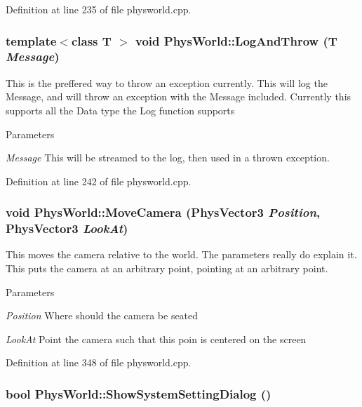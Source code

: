 Definition at line 235 of file physworld.cpp.\hypertarget{classPhysWorld_a1c2aeaed2a89821a4545db854da33ab8}{
\subsubsection[{LogAndThrow}]{\setlength{\rightskip}{0pt plus 5cm}template$<$class T $>$ void PhysWorld::LogAndThrow (T {\em Message})}}
\label{db/df5/classPhysWorld_a1c2aeaed2a89821a4545db854da33ab8}


This is the preffered way to throw an exception currently. This will log the Message, and will throw an exception with the Message included. Currently this supports all the Data type the Log function supports 
\begin{DoxyParams}{Parameters}
\item[{\em Message}]This will be streamed to the log, then used in a thrown exception. \end{DoxyParams}


Definition at line 242 of file physworld.cpp.\hypertarget{classPhysWorld_a1df24ee06d5881825902b60e0d81174a}{
\subsubsection[{MoveCamera}]{\setlength{\rightskip}{0pt plus 5cm}void PhysWorld::MoveCamera ({\bf PhysVector3} {\em Position}, \/  {\bf PhysVector3} {\em LookAt})}}
\label{db/df5/classPhysWorld_a1df24ee06d5881825902b60e0d81174a}


This moves the camera relative to the world. The parameters really do explain it. This puts the camera at an arbitrary point, pointing at an arbitrary point. 
\begin{DoxyParams}{Parameters}
\item[{\em Position}]Where should the camera be seated \item[{\em LookAt}]Point the camera such that this poin is centered on the screen \end{DoxyParams}


Definition at line 348 of file physworld.cpp.\hypertarget{classPhysWorld_a9b83f04907443c6307956a3c4089e3ca}{
\subsubsection[{ShowSystemSettingDialog}]{\setlength{\rightskip}{0pt plus 5cm}bool PhysWorld::ShowSystemSettingDialog ()}}
\label{db/df5/classPhysWorld_a9b83f04907443c6307956a3c4089e3ca}


